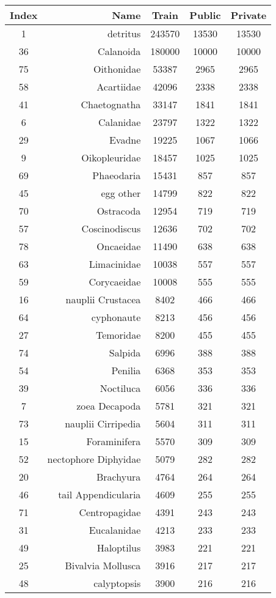 \begin{tabular}{|c|r|c|c|c|}
Index & Name & Train & Public & Private\\
\hline1  & detritus & 243570& 13530& 13530\\
36  & Calanoida & 180000& 10000& 10000\\
75  & Oithonidae & 53387& 2965& 2965\\
58  & Acartiidae & 42096& 2338& 2338\\
41  & Chaetognatha & 33147& 1841& 1841\\
6  & Calanidae & 23797& 1322& 1322\\
29  & Evadne & 19225& 1067& 1066\\
9  & Oikopleuridae & 18457& 1025& 1025\\
69  & Phaeodaria & 15431& 857& 857\\
45  & egg  other & 14799& 822& 822\\
70  & Ostracoda & 12954& 719& 719\\
57  & Coscinodiscus & 12636& 702& 702\\
78  & Oncaeidae & 11490& 638& 638\\
63  & Limacinidae & 10038& 557& 557\\
59  & Corycaeidae & 10008& 555& 555\\
16  & nauplii  Crustacea & 8402& 466& 466\\
64  & cyphonaute & 8213& 456& 456\\
27  & Temoridae & 8200& 455& 455\\
74  & Salpida & 6996& 388& 388\\
54  & Penilia & 6368& 353& 353\\
39  & Noctiluca & 6056& 336& 336\\
7  & zoea  Decapoda & 5781& 321& 321\\
73  & nauplii  Cirripedia & 5604& 311& 311\\
15  & Foraminifera & 5570& 309& 309\\
52  & nectophore  Diphyidae & 5079& 282& 282\\
20  & Brachyura & 4764& 264& 264\\
46  & tail  Appendicularia & 4609& 255& 255\\
71  & Centropagidae & 4391& 243& 243\\
31  & Eucalanidae & 4213& 233& 233\\
49  & Haloptilus & 3983& 221& 221\\
25  & Bivalvia  Mollusca & 3916& 217& 217\\
48  & calyptopsis & 3900& 216& 216\\

\end{tabular}
